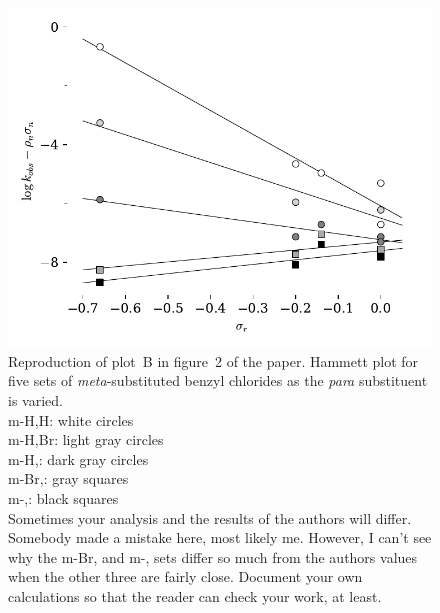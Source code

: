 \documentclass{tufte-handout}
\begin{document}
\begin{figure}[h!]
  \centering
  \includegraphics[scale=0.8]{images/plot4.pdf}
  \caption[-0mm]{Reproduction of plot~B in figure~2 of the paper. Hammett plot for five sets of \textit{meta}-substituted benzyl chlorides as the \textit{para} substituent is varied.  \vspace{2mm} \\
  {m-H,H}: white circles  \\
  {m-H,Br}: light gray circles  \\
  {m-H,}: dark gray circles  \\
  {m-Br,}: gray squares   \\
  {m-,}: black squares  \\
  
   \vspace{20mm} {} Sometimes your analysis and the results of the authors will differ. Somebody made a mistake here, most likely me. However, I can't see why the {m-Br,} and {m-,} sets differ so much from the authors values when the other three are fairly close. Document your own calculations so that the reader can check your work, at least. 
 } 
  \label{fig:fig2B_MyOwn}
\end{figure}
\end{document}
